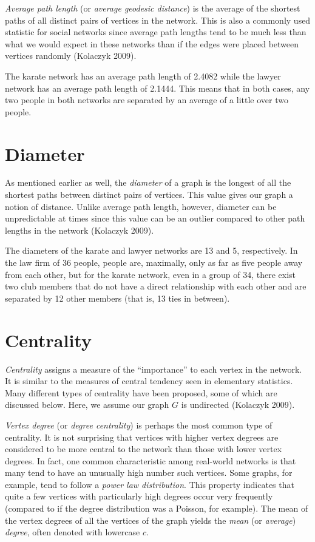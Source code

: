 \documentclass[12pt,twoside]{amherstthesis}
\begin{document}
  \emph{Average path length} (or \emph{average geodesic distance}) is the
  average of the shortest paths of all distinct pairs of vertices in the
  network. This is also a commonly used statistic for social networks
  since average path lengths tend to be much less than what we would
  expect in these networks than if the edges were placed between vertices
  randomly (Kolaczyk 2009).
  
  The karate network has an average path length of 2.4082 while the lawyer
  network has an average path length of 2.1444. This means that in both
  cases, any two people in both networks are separated by an average of a
  little over two people.
  
  \section{Diameter}\label{diameter}
  
  As mentioned earlier as well, the \emph{diameter} of a graph is the
  longest of all the shortest paths between distinct pairs of vertices.
  This value gives our graph a notion of distance. Unlike average path
  length, however, diameter can be unpredictable at times since this value
  can be an outlier compared to other path lengths in the network
  (Kolaczyk 2009).
  
  The diameters of the karate and lawyer networks are 13 and 5,
  respectively. In the law firm of 36 people, people are, maximally, only
  as far as five people away from each other, but for the karate network,
  even in a group of 34, there exist two club members that do not have a
  direct relationship with each other and are separated by 12 other
  members (that is, 13 ties in between).
  
  \section{Centrality}\label{centrality}
  
  \emph{Centrality} assigns a measure of the ``importance'' to each vertex
  in the network. It is similar to the measures of central tendency seen
  in elementary statistics. Many different types of centrality have been
  proposed, some of which are discussed below. Here, we assume our graph
  \(G\) is undirected (Kolaczyk 2009).
  
  \emph{Vertex degree} (or \emph{degree centrality}) is perhaps the most
  common type of centrality. It is not surprising that vertices with
  higher vertex degrees are considered to be more central to the network
  than those with lower vertex degrees. In fact, one common characteristic
  among real-world networks is that many tend to have an unusually high
  number such vertices. Some graphs, for example, tend to follow a
  \emph{power law distribution}. This property indicates that quite a few
  vertices with particularly high degrees occur very frequently (compared
  to if the degree distribution was a Poisson, for example). The mean of
  the vertex degrees of all the vertices of the graph yields the
  \emph{mean} (or \emph{average}) \emph{degree}, often denoted with
  lowercase \(c\).
  
\end{document}
